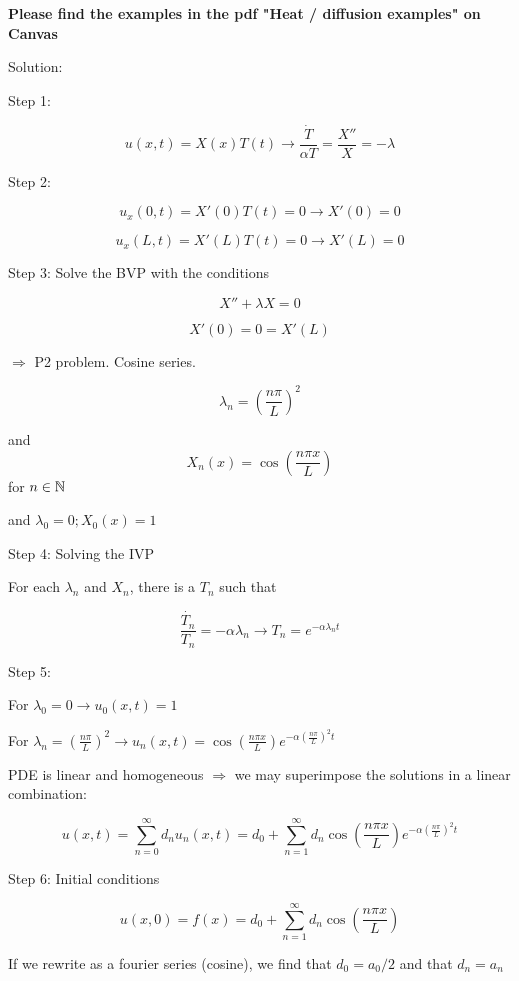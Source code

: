 \documentclass{article}
\begin{document}
\textbf{Please find the examples in the pdf "Heat / diffusion examples" on Canvas}

\begin{center}
    Solution:
\end{center}

Step 1:

$$u(x,t) = X(x) T(t) \rightarrow \frac{\dot T}{\alpha T} = \frac{X''}{X} = -\lambda$$

Step 2:

$$u_x (0,t) = X'(0) T(t) = 0 \rightarrow X'(0) = 0$$

$$u_x (L,t) = X'(L) T(t) = 0 \rightarrow X'(L) = 0$$

Step 3: Solve the BVP with the conditions

$$X'' + \lambda X = 0$$

$$X'(0) = 0 = X'(L)$$

$\Rightarrow$ P2 problem. Cosine series. 

$$\lambda_n = \left(\frac{n \pi}{L} \right)^2$$

and $$X_n(x) = \cos(\frac{n \pi x}{L})$$ for $n \in \mathbb{N}$

and $\lambda_0 = 0; X_0 (x) = 1$

\hfill

\hfill

Step 4: Solving the IVP

For each $\lambda_n$ and $X_n$, there is a $T_n$ such that

$$\frac{\dot{T_n}}{T_n} = -\alpha \lambda_n \rightarrow T_n = e^{- \alpha \lambda_n t}$$

Step 5: 

For $\lambda_0 = 0 \rightarrow u_0 (x,t) = 1$

For $\lambda_n = \left(\frac{n \pi}{L} \right)^2 \rightarrow u_n (x,t) = \cos \left(\frac{n \pi x}{L} \right) e^{- \alpha \left(\frac{n \pi}{L} \right)^2 t}$

PDE is linear and homogeneous $\Rightarrow$ we may superimpose the solutions in a linear combination:

$$u(x,t) = \sum_{n = 0}^\infty d_n u_n (x,t) = d_0 + \sum_{n  =1}^\infty d_n \cos \left(\frac{n \pi x}{L} \right) e^{- \alpha \left(\frac{n \pi}{L} \right)^2 t}$$

Step 6: Initial conditions

$$u(x,0) = f(x) = d_0 + \sum_{n =1}^\infty d_n \cos \left(\frac{n \pi x}{L} \right)$$

If we rewrite as a fourier series (cosine), we find that $d_0 = a_0 / 2$ and that $d_n = a_n$
\end{document}
